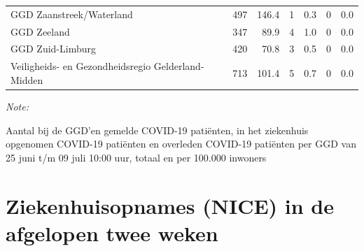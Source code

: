 \documentclass[
  english,
  man,floatsintext]{apa6}
\begin{document}
\begin{table}
\begin{threeparttable}
\begin{tabular}{lrrrrrr}
GGD Zaanstreek/Waterland & 497 & 146.4 & 1 & 0.3 & 0 & 0.0\\
GGD Zeeland & 347 & 89.9 & 4 & 1.0 & 0 & 0.0\\
GGD Zuid-Limburg & 420 & 70.8 & 3 & 0.5 & 0 & 0.0\\
Veiligheids- en Gezondheidsregio Gelderland-Midden & 713 & 101.4 & 5 & 0.7 & 0 & 0.0\\
\bottomrule
\end{tabular}
\begin{tablenotes}
\item \textit{Note: } 
\item Aantal bij de GGD’en gemelde COVID-19 patiënten, in het ziekenhuis opgenomen COVID-19 patiënten en overleden COVID-19 patiënten per GGD van 25 juni t/m 09 juli 10:00 uur, totaal en per 100.000 inwoners
\end{tablenotes}
\end{threeparttable}
\endgroup{}
\end{table}

\newpage

\hypertarget{ziekenhuisopnames-nice-in-de-afgelopen-twee-weken}{%
\section{Ziekenhuisopnames (NICE) in de afgelopen twee weken}\label{ziekenhuisopnames-nice-in-de-afgelopen-twee-weken}}
\end{document}
